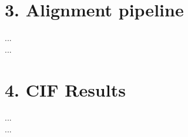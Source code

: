 \documentclass[table,
12pt, %
a4paper, %
oneside, %
headinclude,footinclude, %
BCOR5mm, %
]{scrartcl}
\begin{document}
\section{3. Alignment pipeline}
...\\
...

\section{4. CIF Results}

...\\
...


\newpage
\
\renewcommand{\refname}{\spacedlowsmallcaps{References}} %




\end{document}
